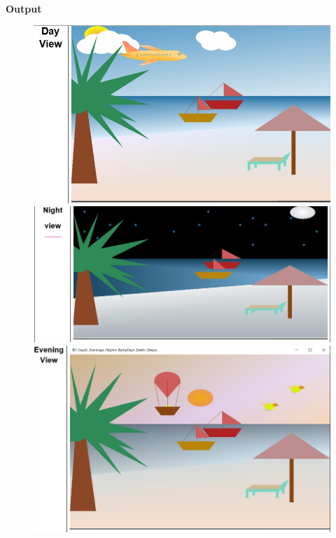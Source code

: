 \documentclass{article}
\begin{document}
\begin{center}
\begin{tabular}{c|c}
                 


    
    
    
    
    
\end{tabular}
\\
\end{center}

\begin{center}
    \textbf{Output}
   \begin{figure}
       \centering
       \includegraphics[width=5in]{Day View.jpg}\\
    \includegraphics[width=5in]{Night View.jpg}\\
    \includegraphics[width=5in]{Evening view.jpg}\\

\end{figure}
\end{center}
\end{document}
